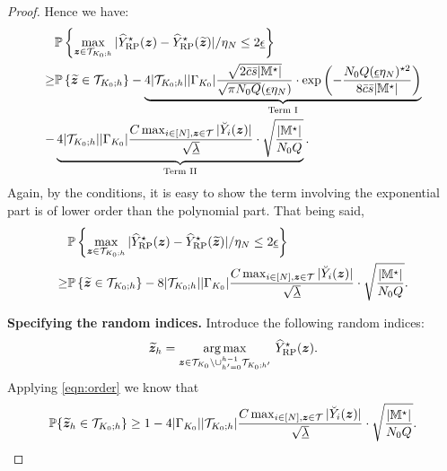 \documentclass[12pt]{article}
\begin{document}
\begin{proof}
Hence we  have:
\begin{align*}
    &{\mathbb{P}}\left\{\max_{{\boldsymbol{z}}\in{\mathcal{T}}_{K_0;h}}|{\widehat{Y}}^\star_{\operatorname{RP}}({\boldsymbol{z}}) - {\widehat{Y}}^\star_{\operatorname{RP}}(\widetilde{{\boldsymbol{z}}})|/\eta_N \le 2\underline{\epsilon}\right\} \\
    \ge & {\mathbb{P}}\left\{\widetilde{{\boldsymbol{z}}}\in {\mathcal{T}}_{K_0;h}\right\} -   \underbrace{4|{\mathcal{T}}_{K_0;h}| |\Gamma_{K_0}|  \frac{\sqrt{2\bar{c}\bar{s}|{\mathbb{M}}^\star|}}{\sqrt{\pi N_0Q }({\underline{\epsilon}\eta_N})}\cdot \exp\left(-\frac{ N_0Q ({\underline{\epsilon}\eta_N})^{\star 2}}{8\bar{c}\bar{s}|{\mathbb{M}}^\star|}\right)}_{\text{Term I}}\notag\\
    - &  \underbrace{4|{\mathcal{T}}_{K_0;h}| |\Gamma_{K_0}| \frac{C \max_{i\in[N],{\boldsymbol{z}}\in{\mathcal{T}}}|\breve{Y}_i({\boldsymbol{z}})| }{\sqrt{\underline{\lambda}}}\cdot \sqrt{\frac{|{\mathbb{M}}^\star|}{N_0Q}}}_{\text{Term II}}.
\end{align*}
Again, by the conditions, it is easy to show the term involving the exponential part is of lower order than the polynomial part. That being said,
\begin{align*}
    &{\mathbb{P}}\left\{\max_{{\boldsymbol{z}}\in{\mathcal{T}}_{K_0;h}}|{\widehat{Y}}^\star_{\operatorname{RP}}({\boldsymbol{z}}) - {\widehat{Y}}^\star_{\operatorname{RP}}(\widetilde{{\boldsymbol{z}}})|/\eta_N \le 2\underline{\epsilon}\right\} \\
    \ge & {\mathbb{P}}\left\{\widetilde{{\boldsymbol{z}}}\in {\mathcal{T}}_{K_0;h}\right\} 
    - 8|{\mathcal{T}}_{K_0;h}| |\Gamma_{K_0}| \frac{C \max_{i\in[N],{\boldsymbol{z}}\in{\mathcal{T}}}|\breve{Y}_i({\boldsymbol{z}})| }{\sqrt{\underline{\lambda}}}\cdot \sqrt{\frac{|{\mathbb{M}}^\star|}{N_0 Q}}.
\end{align*}

\textbf{Specifying the random indices.}
    Introduce the following random indices:
    \begin{align*}
        \widetilde{{\boldsymbol{z}}}_h = \underset{{\boldsymbol{z}}\in{\mathcal{T}}_{K_0}\backslash\cup_{h'=0}^{h-1} {{\mathcal{T}}}_{K_0;h'}}{\arg\max}~{\widehat{Y}}^\star_{\operatorname{RP}}({\boldsymbol{z}}).
    \end{align*}
    Applying \eqref{eqn:order} we know that
    \begin{align*}
        {\mathbb{P}}\{\widetilde{{\boldsymbol{z}}}_h\in{\mathcal{T}}_{K_0;h}\} \ge 1 - 4|\Gamma_{K_0}||{\mathcal{T}}_{K_0;h}|\frac{C \max_{i\in[N],{\boldsymbol{z}}\in{\mathcal{T}}}|\breve{Y}_i({\boldsymbol{z}})| }{\sqrt{\underline{\lambda}}}\cdot \sqrt{\frac{|{\mathbb{M}}^\star|}{N_0 Q}}.
    \end{align*}


\end{proof}
\end{document}
